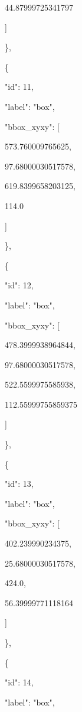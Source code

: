 \documentclass[10pt,a4paper]{article}
\begin{document}
        44.87999725341797\par
      ]\par
    \},\allowbreak{}\par
    \{\par
      "id":\allowbreak{} 11,\allowbreak{}\par
      "label":\allowbreak{} "box",\allowbreak{}\par
      "bbox\_xyxy":\allowbreak{} [\par
        573.760009765625,\allowbreak{}\par
        97.68000030517578,\allowbreak{}\par
        619.8399658203125,\allowbreak{}\par
        114.0\par
      ]\par
    \},\allowbreak{}\par
    \{\par
      "id":\allowbreak{} 12,\allowbreak{}\par
      "label":\allowbreak{} "box",\allowbreak{}\par
      "bbox\_xyxy":\allowbreak{} [\par
        478.3999938964844,\allowbreak{}\par
        97.68000030517578,\allowbreak{}\par
        522.5599975585938,\allowbreak{}\par
        112.55999755859375\par
      ]\par
    \},\allowbreak{}\par
    \{\par
      "id":\allowbreak{} 13,\allowbreak{}\par
      "label":\allowbreak{} "box",\allowbreak{}\par
      "bbox\_xyxy":\allowbreak{} [\par
        402.239990234375,\allowbreak{}\par
        25.68000030517578,\allowbreak{}\par
        424.0,\allowbreak{}\par
        56.39999771118164\par
      ]\par
    \},\allowbreak{}\par
    \{\par
      "id":\allowbreak{} 14,\allowbreak{}\par
      "label":\allowbreak{} "box",\allowbreak{}\par
\end{document}
